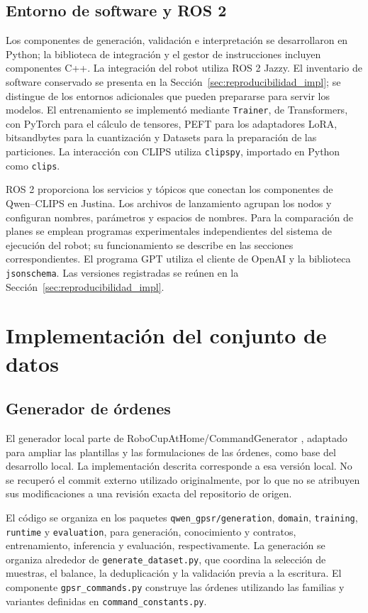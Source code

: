 \subsection{Entorno de software y ROS 2}

Los componentes de generación, validación e interpretación se
desarrollaron en Python; la biblioteca de integración y el gestor de
instrucciones incluyen componentes C++. La integración del robot utiliza
ROS 2 Jazzy. El inventario de software conservado se presenta en la
Sección~\ref{sec:reproducibilidad_impl}; se distingue de los entornos
adicionales que pueden prepararse para servir los modelos.
El entrenamiento se implementó mediante
\texttt{Trainer}, de Transformers, con PyTorch para el cálculo de
tensores, PEFT para los adaptadores LoRA, bitsandbytes para la
cuantización y Datasets para la preparación de las particiones.
La interacción con CLIPS utiliza \texttt{clipspy}, importado en Python
como \texttt{clips}.

ROS 2 proporciona los servicios y tópicos que conectan los componentes
de Qwen--CLIPS en Justina. Los archivos de lanzamiento agrupan los nodos
y configuran nombres, parámetros y espacios de nombres. Para la
comparación de planes se emplean programas experimentales independientes
del sistema de ejecución del robot; su funcionamiento se describe en
las secciones correspondientes. El programa GPT utiliza el cliente de
OpenAI y la biblioteca \texttt{jsonschema}. Las versiones registradas
se reúnen en la Sección~\ref{sec:reproducibilidad_impl}.

\section{Implementación del conjunto de datos}
\label{sec:implementacion_dataset}

\subsection{Generador de órdenes}

El generador local parte de RoboCupAtHome/CommandGenerator
\cite{robocup_command_generator}, adaptado para ampliar las plantillas y
las formulaciones de las órdenes, como base del desarrollo local. La implementación descrita corresponde a esa versión local.
No se recuperó el commit externo utilizado originalmente, por lo que
no se atribuyen sus modificaciones a una revisión exacta del repositorio
de origen.

El código se organiza en los paquetes \texttt{qwen\_\allowbreak gpsr/\allowbreak generation},
\texttt{domain}, \texttt{training}, \texttt{runtime} y
\texttt{evaluation}, para generación, conocimiento y contratos,
entrenamiento, inferencia y evaluación, respectivamente.
La generación se organiza alrededor de \texttt{generate\_\allowbreak dataset.\allowbreak py},
que coordina la selección de muestras, el balance, la deduplicación y
la validación previa a la escritura. El componente
\texttt{gpsr\_\allowbreak commands.\allowbreak py} construye las órdenes utilizando las familias
y variantes definidas en \texttt{command\_\allowbreak constants.\allowbreak py}.

